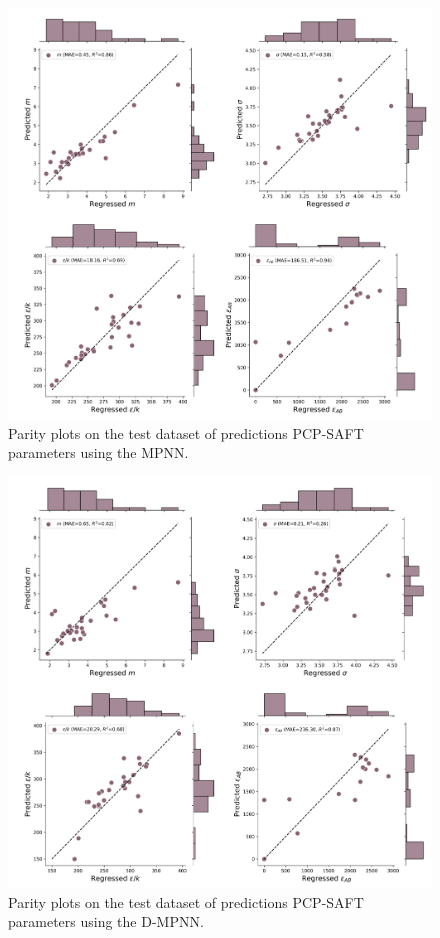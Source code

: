 \begin{figure}
    \centering
    \includegraphics[width=\textwidth]{gfx/Chapter07/mpnn_parity_plots.png}
    \caption{Parity plots on the test dataset of predictions PCP-SAFT parameters using the MPNN.}
    \label{fig:mpnn}
\end{figure}


\begin{figure}
    \centering
    \includegraphics[width=\textwidth]{gfx/Chapter07/dmpnn_parity_plots.png}
    \caption{Parity plots on the test dataset of predictions PCP-SAFT parameters using the D-MPNN.}
    \label{fig:dmpnn}
\end{figure}

